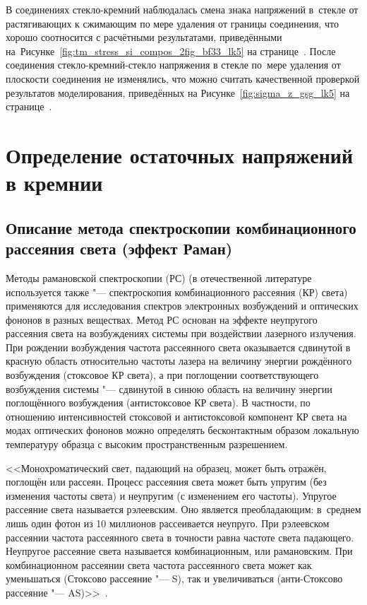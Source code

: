В соединениях стекло-кремний наблюдалась смена знака напряжений в~стекле от
растягивающих к сжимающим по мере удаления от границы соединения, что хорошо
соотносится с расчётными результатами, приведёнными
на~Рисунке~\ref{fig:tm_stress_si_compos_2fig_bf33_lk5}
на странице~\pageref{fig:tm_stress_si_compos_2fig_bf33_lk5}.
После соединения стекло-кремний-стекло напряжения в стекле по~мере удаления от
плоскости соединения не изменялись, что можно считать качественной проверкой
результатов моделирования, приведённых на Рисунке~\ref{fig:sigma_z_gsg_lk5}
на странице~\pageref{fig:sigma_z_gsg_lk5}.

\section{Определение остаточных напряжений в кремнии}
\subsection{Описание метода спектроскопии комбинационного рассеяния света (эффект Раман)}
Методы рамановской спектроскопии (РС) (в отечественной литературе используется также "--- спектроскопия комбинационного рассеяния (КР) света) применяются для исследования спектров электронных возбуждений и оптических фононов в разных веществах. Метод РС основан на эффекте неупругого рассеяния света на возбуждениях системы при воздействии лазерного излучения. При рождении возбуждения частота рассеянного света оказывается сдвинутой в красную область относительно частоты лазера на величину энергии рождённого возбуждения (стоксовое КР света), а при поглощении соответствующего возбуждения системы "--- сдвинутой в синюю область на величину энергии поглощённого возбуждения (антистоксовое КР света). В частности, по отношению интенсивностей стоксовой и антистоксовой компонент КР света на модах оптических фононов можно определять бесконтактным образом локальную температуру образца с высоким пространственным разрешением.

<<Монохроматический свет, падающий на образец, может быть отражён, поглощён или рассеян. Процесс рассеяния света может быть упругим (без изменения частоты света) и неупругим (с изменением его частоты).
Упругое рассеяние света называется рэлеевским. Оно является преобладающим: в~среднем лишь один фотон из 10 миллионов рассеивается неупруго. При рэлеевском рассеянии частота рассеянного света в точности равна частоте света падающего.
Неупругое рассеяние света называется комбинационным, или рамановским. При комбинационном рассеянии света частота рассеянного света может как уменьшаться (Стоксово рассеяние "--- S), так и увеличиваться (анти-Стоксово рассеяние "--- AS)>>~\cite{belogorohov2014_dis}.

